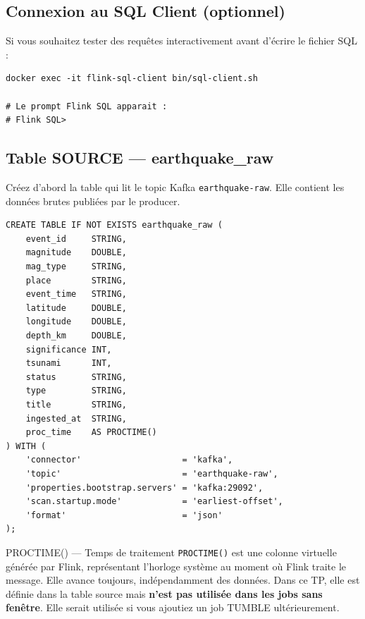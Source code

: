 \documentclass[12pt,a4paper]{article}
\begin{document}
\subsection{Connexion au SQL Client (optionnel)}

Si vous souhaitez tester des requêtes interactivement avant d'écrire le fichier SQL :

\begin{lstlisting}[style=bash, caption={Accès au Flink SQL Client interactif}]
docker exec -it flink-sql-client bin/sql-client.sh

# Le prompt Flink SQL apparait :
# Flink SQL>
\end{lstlisting}

\subsection{Table SOURCE --- earthquake\_raw}

Créez d'abord la table qui lit le topic Kafka \texttt{earthquake-raw}.
Elle contient les données brutes publiées par le producer.

\begin{lstlisting}[style=sql, caption={Table source --- earthquake\_raw}]
CREATE TABLE IF NOT EXISTS earthquake_raw (
    event_id     STRING,
    magnitude    DOUBLE,
    mag_type     STRING,
    place        STRING,
    event_time   STRING,
    latitude     DOUBLE,
    longitude    DOUBLE,
    depth_km     DOUBLE,
    significance INT,
    tsunami      INT,
    status       STRING,
    type         STRING,
    title        STRING,
    ingested_at  STRING,
    proc_time    AS PROCTIME()
) WITH (
    'connector'                    = 'kafka',
    'topic'                        = 'earthquake-raw',
    'properties.bootstrap.servers' = 'kafka:29092',
    'scan.startup.mode'            = 'earliest-offset',
    'format'                       = 'json'
);
\end{lstlisting}

\begin{conceptbox}{PROCTIME() --- Temps de traitement}
  \texttt{PROCTIME()} est une colonne virtuelle générée par Flink,
  représentant l'horloge système au moment où Flink traite le message.
  Elle avance toujours, indépendamment des données.
  Dans ce TP, elle est définie dans la table source mais
  \textbf{n'est pas utilisée dans les jobs sans fenêtre}.
  Elle serait utilisée si vous ajoutiez un job TUMBLE ultérieurement.
\end{conceptbox}
\end{document}
